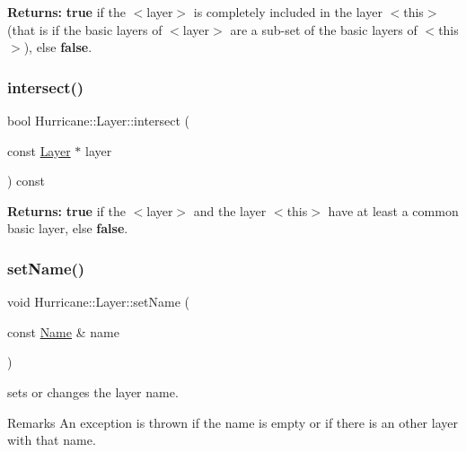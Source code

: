 {\bfseries Returns\+:} {\bfseries true} if the {\ttfamily $<$layer$>$} is completely included in the layer {\ttfamily $<$this$>$} (that is if the basic layers of {\ttfamily $<$layer$>$} are a sub-\/set of the basic layers of {\ttfamily $<$this$>$}), else {\bfseries false}. \mbox{\label{classHurricane_1_1Layer_adbea0bafaa87b033efdaa98bf2709182}} 
\subsubsection{\texorpdfstring{intersect()}{intersect()}}
{\footnotesize\ttfamily bool Hurricane\+::\+Layer\+::intersect (\begin{DoxyParamCaption}\item[{const \mbox{\hyperlink{classHurricane_1_1Layer}{Layer}} $\ast$}]{layer }\end{DoxyParamCaption}) const}

{\bfseries Returns\+:} {\bfseries true} if the {\ttfamily $<$layer$>$} and the layer {\ttfamily $<$this$>$} have at least a common basic layer, else {\bfseries false}. \mbox{\label{classHurricane_1_1Layer_ab93809f19bc360f58d35e91438ef2f87}} 
\subsubsection{\texorpdfstring{set\+Name()}{setName()}}
{\footnotesize\ttfamily void Hurricane\+::\+Layer\+::set\+Name (\begin{DoxyParamCaption}\item[{const \mbox{\hyperlink{classHurricane_1_1Name}{Name}} \&}]{name }\end{DoxyParamCaption})}

sets or changes the layer name.

\begin{DoxyRemark}{Remarks}
An exception is thrown if the name is empty or if there is an other layer with that name. 
\end{DoxyRemark}
\mbox{\label{classHurricane_1_1Layer_a400d17fe999c0080bb50489948986fe7}} 
